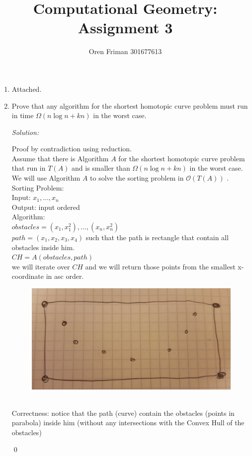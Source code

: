 \documentclass[a4paper, 8pt, oneside]{article}
\newenvironment{sol}
    {\emph{Solution:}
    }
    {
    \qed
    }
\begin{document}
\title{Computational Geometry: Assignment 3}
\author{Oren Friman 301677613}
\maketitle

\medskip

\begin{enumerate}
\item Attached.
\item Prove that any algorithm for the shortest homotopic curve problem must run in time $\Omega(n\log n + kn)$ in the worst case.

\begin{sol}
Proof by contradiction using reduction.  \\
Assume that there is Algorithm $A$ for the shortest homotopic curve problem that run in $T(A)$ and is smaller than $\Omega(n\log n + kn)$ in the worst case.
We will use Algorithm $A$ to solve the sorting problem in $\mathcal{O}(T(A))$ . \\

Sorting Problem: \\
Input: $x_1, \ldots, x_n$ \\
Output: input ordered \\
Algorithm:\\
$obstacles = (x_1, x_1^2), \ldots, (x_n, x_n^2)$ \\
$path =  (x_1, x_2, x_3, x_4)$ such that the path is rectangle that contain all obstacles inside him.\\
$CH = A(obstacles, path)$ \\
we will iterate over $CH$ and we will return those points from the smallest x-coordinate in asc order.
\begin{figure}[h]
\includegraphics[scale=0.1]{parabola}
\centering
\end{figure} \\
Correctness: notice that the path (curve) contain the obstacles (points in parabola) inside him (without any intersections with the Convex Hull of the obstacles)


\end{sol}
\end{enumerate}
\end{document}
